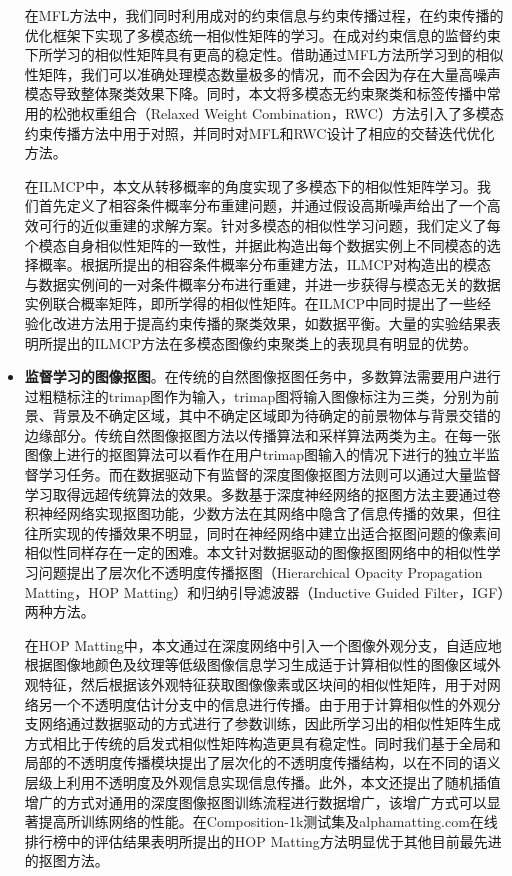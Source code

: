\begin{itemize}
    \indent 在MFL方法中，我们同时利用成对的约束信息与约束传播过程，在约束传播的优化框架下实现了多模态统一相似性矩阵的学习。在成对约束信息的监督约束下所学习的相似性矩阵具有更高的稳定性。借助通过MFL方法所学习到的相似性矩阵，我们可以准确处理模态数量极多的情况，而不会因为存在大量高噪声模态导致整体聚类效果下降。同时，本文将多模态无约束聚类和标签传播中常用的松弛权重组合（Relaxed Weight Combination，RWC）方法引入了多模态约束传播方法中用于对照，并同时对MFL和RWC设计了相应的交替迭代优化方法。

    \indent 在ILMCP中，本文从转移概率的角度实现了多模态下的相似性矩阵学习。我们首先定义了相容条件概率分布重建问题，并通过假设高斯噪声给出了一个高效可行的近似重建的求解方案。针对多模态的相似性学习问题，我们定义了每个模态自身相似性矩阵的一致性，并据此构造出每个数据实例上不同模态的选择概率。根据所提出的相容条件概率分布重建方法，ILMCP对构造出的模态与数据实例间的一对条件概率分布进行重建，并进一步获得与模态无关的数据实例联合概率矩阵，即所学得的相似性矩阵。在ILMCP中同时提出了一些经验化改进方法用于提高约束传播的聚类效果，如数据平衡。大量的实验结果表明所提出的ILMCP方法在多模态图像约束聚类上的表现具有明显的优势。
    

    \item {\bf{监督学习的图像抠图}}。在传统的自然图像抠图任务中，多数算法需要用户进行过粗糙标注的trimap图作为输入，trimap图将输入图像标注为三类，分别为前景、背景及不确定区域，其中不确定区域即为待确定的前景物体与背景交错的边缘部分。传统自然图像抠图方法以传播算法和采样算法两类为主。在每一张图像上进行的抠图算法可以看作在用户trimap图输入的情况下进行的独立半监督学习任务。而在数据驱动下有监督的深度图像抠图方法则可以通过大量监督学习取得远超传统算法的效果。多数基于深度神经网络的抠图方法主要通过卷积神经网络实现抠图功能，少数方法在其网络中隐含了信息传播的效果\cite{samplenet,cai2019disentangled}，但往往所实现的传播效果不明显，同时在神经网络中建立出适合抠图问题的像素间相似性同样存在一定的困难。本文针对数据驱动的图像抠图网络中的相似性学习问题提出了层次化不透明度传播抠图（Hierarchical Opacity Propagation Matting，HOP Matting）和归纳引导滤波器（Inductive Guided Filter，IGF）两种方法。

    \indent 在HOP Matting中，本文通过在深度网络中引入一个图像外观分支，自适应地根据图像地颜色及纹理等低级图像信息学习生成适于计算相似性的图像区域外观特征，然后根据该外观特征获取图像像素或区块间的相似性矩阵，用于对网络另一个不透明度估计分支中的信息进行传播。由于用于计算相似性的外观分支网络通过数据驱动的方式进行了参数训练，因此所学习出的相似性矩阵生成方式相比于传统的启发式相似性矩阵构造更具有稳定性。同时我们基于全局和局部的不透明度传播模块提出了层次化的不透明度传播结构，以在不同的语义层级上利用不透明度及外观信息实现信息传播。此外，本文还提出了随机插值增广的方式对通用的深度图像抠图训练流程进行数据增广，该增广方式可以显著提高所训练网络的性能。在Composition-1k测试集\cite{xu2017deep}及alphamatting.com在线排行榜\cite{rhemann2009perceptually}中的评估结果表明所提出的HOP Matting方法明显优于其他目前最先进的抠图方法。


\end{itemize}
